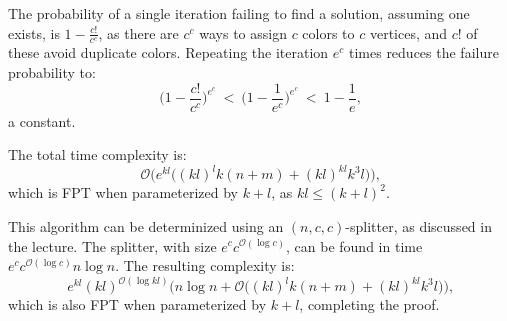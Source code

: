 \documentclass[12pt]{article}
\begin{document}
	\medskip
	
	The probability of a single iteration failing to find a solution, assuming
	one exists, is \(1 - \frac{c!}{c^{c}}\), as there are \(c^{c}\) ways to
	assign \(c\) colors to \(c\) vertices, and \(c!\) of these avoid duplicate
	colors. Repeating the iteration \(e^{c}\) times reduces the failure
	probability to:
	\[ \bigg( 1 - \frac{c!}{c^{c}} \bigg)^{e^{c}} \ < \ \bigg( 1 -
	\frac{1}{e^{c}} \bigg)^{e^{c}} \ < \ 1 - \frac{1}{e} \text{,} \]
	a constant.
	
	\medskip
	
	The total time complexity is:
	\[ \mathcal{O} \big( e^{kl} \big( (kl)^l k (n + m) + (kl)^{kl} k^{3} l \big)
	\big) \text{,} \]
	which is FPT when parameterized by \(k + l\), as \(kl \leqslant
	(k + l)^{2}\).
	
	\medskip
	
	This algorithm can be determinized using an \((n, c, c)\)-splitter, as
	discussed in the lecture. The splitter, with size \(e^{c}
	c^{\mathcal{O}(\log c)}\), can be found in time \(e^{c}
	c^{\mathcal{O}(\log c)} n \log n\). The resulting complexity is:
	\[ e^{kl} (kl)^{\mathcal{O}(\log kl)} \big( n \log n + \mathcal{O} \big(
	(kl)^l k (n + m) + (kl)^{kl} k^{3} l \big) \big) \text{,} \]
	which is also FPT when parameterized by \(k + l\), completing the proof.
\end{document}
